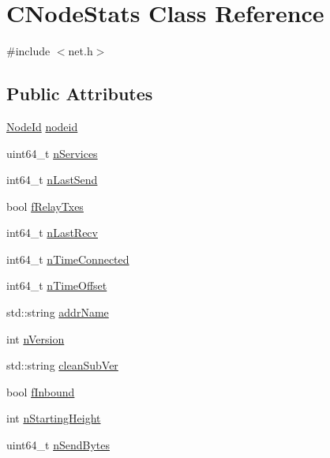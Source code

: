 \hypertarget{class_c_node_stats}{}\section{C\+Node\+Stats Class Reference}
\label{class_c_node_stats}


{\ttfamily \#include $<$net.\+h$>$}

\subsection*{Public Attributes}
\begin{DoxyCompactItemize}
\item 
\mbox{\hyperlink{net_8h_a954d746a58632565552615fd0a4ee660}{Node\+Id}} \mbox{\hyperlink{class_c_node_stats_ad2bceab1a335d59f42af37178b72fee7}{nodeid}}
\item 
uint64\+\_\+t \mbox{\hyperlink{class_c_node_stats_a3c56fe96daccb9339314953d249dfa15}{n\+Services}}
\item 
int64\+\_\+t \mbox{\hyperlink{class_c_node_stats_adc88b64389f26227db58ed86058d2e1a}{n\+Last\+Send}}
\item 
bool \mbox{\hyperlink{class_c_node_stats_a2a5592713ed3de8d19057b0c86632af2}{f\+Relay\+Txes}}
\item 
int64\+\_\+t \mbox{\hyperlink{class_c_node_stats_a67b3cd5817ad20bfb2d9eb1583f1deb5}{n\+Last\+Recv}}
\item 
int64\+\_\+t \mbox{\hyperlink{class_c_node_stats_a3d5133369e51db3c45839c8a68c662d1}{n\+Time\+Connected}}
\item 
int64\+\_\+t \mbox{\hyperlink{class_c_node_stats_a905b33fdcf0443f25fa19ea4d10e8e59}{n\+Time\+Offset}}
\item 
std\+::string \mbox{\hyperlink{class_c_node_stats_a3299ecdae870c367fe657f3f59b27e43}{addr\+Name}}
\item 
int \mbox{\hyperlink{class_c_node_stats_ac8892d29d7c246e34e78fbc15ae77276}{n\+Version}}
\item 
std\+::string \mbox{\hyperlink{class_c_node_stats_ad733b840ac9a16a7eb6166ea4984d8a8}{clean\+Sub\+Ver}}
\item 
bool \mbox{\hyperlink{class_c_node_stats_a34627c46cac7bc2bfb3406c954522b49}{f\+Inbound}}
\item 
int \mbox{\hyperlink{class_c_node_stats_a86ff627e31f8ab881a8e11bb3acf4f19}{n\+Starting\+Height}}
\item 
uint64\+\_\+t \mbox{\hyperlink{class_c_node_stats_a3c70b0862e9ddd682380114016196137}{n\+Send\+Bytes}}

\end{DoxyCompactItemize}
